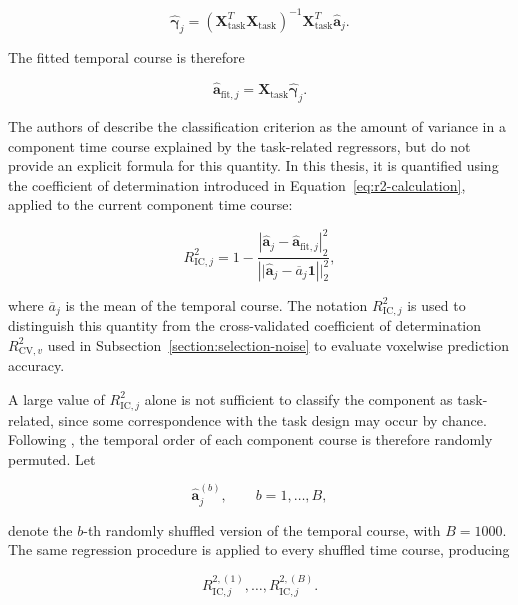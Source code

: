 \documentclass[english]{pwr_wmat_praca_dyplomowa}
\theoremstyle{definition}
\theoremstyle{remark}
\begin{document}
\begin{equation}
    \widehat{\boldsymbol{\gamma}}_j =
    \left(\mathbf{X}_{\mathrm{task}}^{T} \mathbf{X}_{\mathrm{task}} \right)^{-1}
    \mathbf{X}_{\mathrm{task}}^{T}
    \widehat{\mathbf{a}}_j.
\end{equation}

The fitted temporal course is therefore

\begin{equation}
    \widehat{\mathbf{a}}_{\mathrm{fit},j} = \mathbf{X}_{\mathrm{task}} \widehat{\boldsymbol{\gamma}}_j.
\end{equation}

The authors of \cite{glm-denoise} describe the classification criterion as the amount of variance in a component time course explained by the task-related regressors, but do not provide an explicit formula for this quantity. In this thesis, it is quantified using the coefficient of determination introduced in Equation~\eqref{eq:r2-calculation}, applied to the current component time course:

\begin{equation}
    R^2_{\mathrm{IC},j} = 1 - \frac{ \left| \widehat{\mathbf{a}}_j - \widehat{\mathbf{a}}_{\mathrm{fit}, j} \right|_2^2}{\left|| \widehat{\mathbf{a}}_j - \overline{a}_j \mathbf{1} \right||_2^2},
\end{equation}

where $\overline{a}_j$ is the mean of the temporal course. The notation $R^2_{\mathrm{IC}, j}$ is used to distinguish this quantity from the cross-validated coefficient of determination $R^2_{\mathrm{CV},v}$ used in Subsection~\ref{section:selection-noise} to evaluate voxelwise prediction accuracy.

A large value of $R^2_{\mathrm{IC},j}$ alone is not sufficient to classify the component as task-related, since some correspondence with the task design may occur by chance. Following \cite{glm-denoise}, the temporal order of each component course is therefore randomly permuted. Let

\begin{equation}
    \widehat{\mathbf{a}}_j^{(b)}, \qquad b=1,\ldots,B,
\end{equation}

denote the $b$-th randomly shuffled version of the temporal course, with $B=1000$. The same regression procedure is applied to every shuffled time course, producing

\begin{equation}
    R_{\mathrm{IC},j}^{2,(1)}, \ldots, R_{\mathrm{IC},j}^{2,(B)}.
\end{equation}
\end{document}
